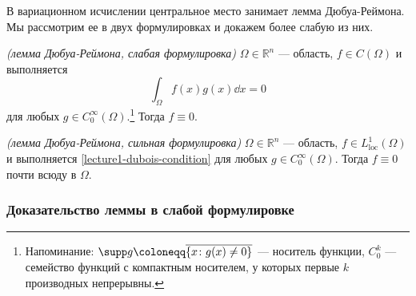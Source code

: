 В вариационном исчислении центральное место занимает лемма Дюбуа-Реймона. Мы рассмотрим ее в двух формулировках и докажем более слабую из них.

\begin{lem}\emph{(лемма Дюбуа-Реймона, слабая формулировка)}
  $\Omega \in \mathbb{R}^n$ --- область, $f \in C(\Omega)$ и выполняется
  \begin{equation}
    \int_\Omega f(x) g(x) \dd x = 0 \label{lecture1-dubois-condition}
  \end{equation}
  для любых $g \in C_0^\infty(\Omega)$.\footnote{Напоминание: $\supp g \coloneqq \overline{\{x \colon g(x) \neq 0 \}}$ --- носитель функции, $C_0^k$ --- семейство функций с компактным носителем, у которых первые $k$ производных непрерывны.} Тогда $f \equiv 0$.
\end{lem}

\begin{lem}\emph{(лемма Дюбуа-Реймона, сильная формулировка)}
  $\Omega \in \mathbb{R}^n$ --- область, {\color{red} $f \in L^1_{\mathrm{loc}}(\Omega)$} и выполняется \eqref{lecture1-dubois-condition} для любых $g \in C_0^\infty(\Omega)$. Тогда $f \equiv 0$ {\color{red} почти всюду в $\Omega$}.
\end{lem}

\subsubsection{Доказательство леммы в слабой формулировке}

